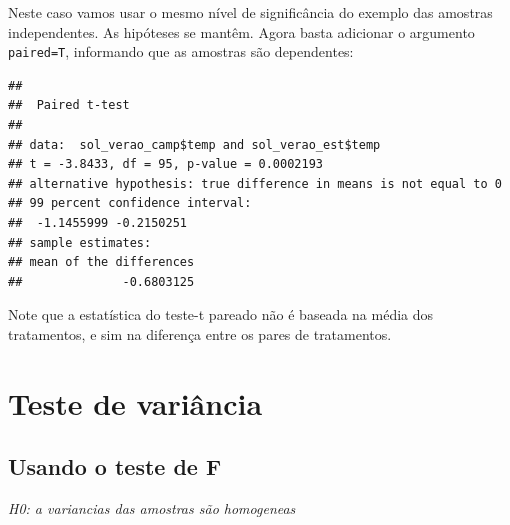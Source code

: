 \documentclass[
]{book}
\newenvironment{Shaded}{\begin{snugshade}}{\end{snugshade}}
\newcommand{\CommentTok}[1]{\textcolor[rgb]{0.56,0.35,0.01}{\textit{#1}}}
\newcommand{\DataTypeTok}[1]{\textcolor[rgb]{0.13,0.29,0.53}{#1}}
\newcommand{\FloatTok}[1]{\textcolor[rgb]{0.00,0.00,0.81}{#1}}
\newcommand{\KeywordTok}[1]{\textcolor[rgb]{0.13,0.29,0.53}{\textbf{#1}}}
\newcommand{\NormalTok}[1]{#1}
\newcommand{\OperatorTok}[1]{\textcolor[rgb]{0.81,0.36,0.00}{\textbf{#1}}}
\begin{document}
Neste caso vamos usar o mesmo nível de significância do exemplo das amostras independentes.
As hipóteses se mantêm. Agora basta adicionar o argumento \texttt{paired=T}, informando que as amostras são dependentes:

\begin{Shaded}
\end{Shaded}

\begin{verbatim}
## 
##  Paired t-test
## 
## data:  sol_verao_camp$temp and sol_verao_est$temp
## t = -3.8433, df = 95, p-value = 0.0002193
## alternative hypothesis: true difference in means is not equal to 0
## 99 percent confidence interval:
##  -1.1455999 -0.2150251
## sample estimates:
## mean of the differences 
##              -0.6803125
\end{verbatim}

Note que a estatística do teste-t pareado não é baseada na média dos tratamentos, e sim na diferença entre os pares de tratamentos.

\hypertarget{teste-de-variuxe2ncia}{%
\section{Teste de variância}\label{teste-de-variuxe2ncia}}

\hypertarget{usando-o-teste-de-f}{%
\subsection{Usando o teste de F}\label{usando-o-teste-de-f}}

\emph{H0: a variancias das amostras são homogeneas }

\begin{Shaded}
\end{Shaded}
\end{document}
